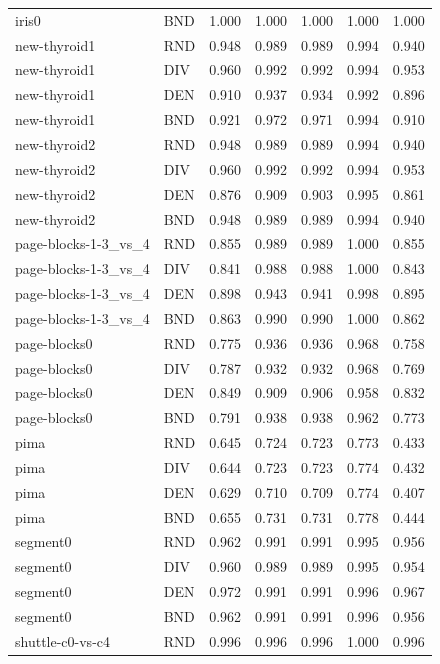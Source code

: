 \documentclass[10pt,a4paper]{article}
\begin{document}
\begin{longtable}{lllllrr}
iris0 & BND & 1.000 & 1.000 & 1.000 & 1.000 & 1.000 \\
new-thyroid1 & RND & 0.948 & 0.989 & 0.989 & 0.994 & 0.940 \\
new-thyroid1 & DIV & 0.960 & 0.992 & 0.992 & 0.994 & 0.953 \\
new-thyroid1 & DEN & 0.910 & 0.937 & 0.934 & 0.992 & 0.896 \\
new-thyroid1 & BND & 0.921 & 0.972 & 0.971 & 0.994 & 0.910 \\
new-thyroid2 & RND & 0.948 & 0.989 & 0.989 & 0.994 & 0.940 \\
new-thyroid2 & DIV & 0.960 & 0.992 & 0.992 & 0.994 & 0.953 \\
new-thyroid2 & DEN & 0.876 & 0.909 & 0.903 & 0.995 & 0.861 \\
new-thyroid2 & BND & 0.948 & 0.989 & 0.989 & 0.994 & 0.940 \\
page-blocks-1-3\_vs\_4 & RND & 0.855 & 0.989 & 0.989 & 1.000 & 0.855 \\
page-blocks-1-3\_vs\_4 & DIV & 0.841 & 0.988 & 0.988 & 1.000 & 0.843 \\
page-blocks-1-3\_vs\_4 & DEN & 0.898 & 0.943 & 0.941 & 0.998 & 0.895 \\
page-blocks-1-3\_vs\_4 & BND & 0.863 & 0.990 & 0.990 & 1.000 & 0.862 \\
page-blocks0 & RND & 0.775 & 0.936 & 0.936 & 0.968 & 0.758 \\
page-blocks0 & DIV & 0.787 & 0.932 & 0.932 & 0.968 & 0.769 \\
page-blocks0 & DEN & 0.849 & 0.909 & 0.906 & 0.958 & 0.832 \\
page-blocks0 & BND & 0.791 & 0.938 & 0.938 & 0.962 & 0.773 \\
pima & RND & 0.645 & 0.724 & 0.723 & 0.773 & 0.433 \\
pima & DIV & 0.644 & 0.723 & 0.723 & 0.774 & 0.432 \\
pima & DEN & 0.629 & 0.710 & 0.709 & 0.774 & 0.407 \\
pima & BND & 0.655 & 0.731 & 0.731 & 0.778 & 0.444 \\
segment0 & RND & 0.962 & 0.991 & 0.991 & 0.995 & 0.956 \\
segment0 & DIV & 0.960 & 0.989 & 0.989 & 0.995 & 0.954 \\
segment0 & DEN & 0.972 & 0.991 & 0.991 & 0.996 & 0.967 \\
segment0 & BND & 0.962 & 0.991 & 0.991 & 0.996 & 0.956 \\
shuttle-c0-vs-c4 & RND & 0.996 & 0.996 & 0.996 & 1.000 & 0.996 \\

\end{longtable}
\end{document}

